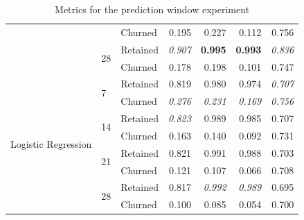 \documentclass{kththesis}
\begin{document}
\begin{table}[h]
\begin{tabular}{lllrrrr}
     &   & Churned &  0.195 &  0.227 &   0.112 &  0.756 \\
\cline{2-7}
     & \multirow{2}{*}{28} & Retained &  \textit{0.907} &  \textbf{0.995} &   \textbf{0.993} &  \textit{0.836} \\
     &   & Churned &  0.178 &  0.198 &   0.101 &  0.747 \\
\cline{1-7}
\cline{2-7}
\multirow{8}{*}{Logistic Regression} & \multirow{2}{*}{7} & Retained &  0.819 &  0.980 &   0.974 &  \textit{0.707} \\
     &   & Churned &  \textit{0.276} &  \textit{0.231} &   \textit{0.169} &  \textit{0.756} \\
\cline{2-7}
     & \multirow{2}{*}{14} & Retained &  \textit{0.823} &  0.989 &   0.985 &  0.707 \\
     &   & Churned &  0.163 &  0.140 &   0.092 &  0.731 \\
\cline{2-7}
     & \multirow{2}{*}{21} & Retained &  0.821 &  0.991 &   0.988 &  0.703 \\
     &   & Churned &  0.121 &  0.107 &   0.066 &  0.708 \\
\cline{2-7}
     & \multirow{2}{*}{28} & Retained &  0.817 &  \textit{0.992} &  \textit{0.989} &  0.695 \\
     &   & Churned &  0.100 &  0.085 &   0.054 &  0.700 \\
\bottomrule
\end{tabular}
\caption{Metrics for the prediction window experiment}
\label{tab:pred_window}
\end{table}

\end{document}
